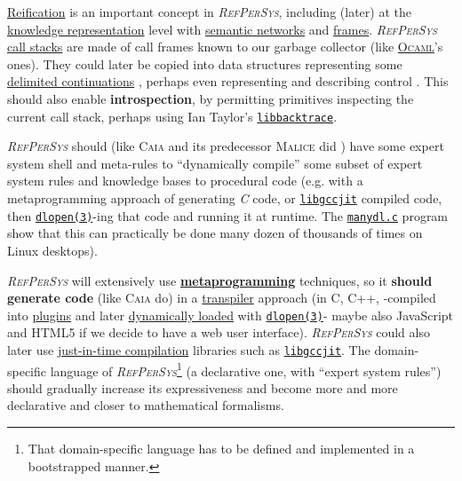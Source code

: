 \documentclass[11pt,a4paper,svgnames]{article}
\newcommand{\RefPerSys}{{\textit{\textsc{RefPerSys}}}}
\begin{document}
\href{https://en.wikipedia.org/wiki/Reification_(computer_science)}{Reification}
is an important concept in \RefPerSys, including (later) at the
\href{https://en.wikipedia.org/wiki/Knowledge_representation_and_reasoning}{knowledge
  representation} level with
\href{https://en.wikipedia.org/wiki/Semantic_network}{semantic
  networks} and
\href{https://en.wikipedia.org/wiki/Frame_(artificial_intelligence)}{frames}. {\RefPerSys}
\href{https://en.wikipedia.org/wiki/Call_stack}{call stacks} are made
of call frames known to our garbage collector (like
\href{https://caml.inria.fr/pub/docs/manual-ocaml/intfc.html}{\textsc{Ocaml}}'s
ones). They could later be copied into data structures representing
some
\href{https://en.wikipedia.org/wiki/Delimited_continuation}{delimited
  continuations} \cite{Reynolds:1993:continuations,
  Queinnec:2004:ContinWeb}, perhaps even representing and describing
control \cite{fouet-starynkevitch:describing-control:1987,
  Starynkevitch-1990-EUM, Pitrat:2009:ArtifBeings}. This should also
enable \textbf{introspection}, by permitting primitives inspecting the
current call stack, perhaps using Ian Taylor's
\href{https://github.com/ianlancetaylor/libbacktrace}{\texttt{libbacktrace}}.


{\RefPerSys} should (like \textsc{Caia} and its predecessor
\textsc{Malice} did
\cite{Pitrat:2009:AST,Pitrat:1996:FGCS,Pitrat:2009:ArtifBeings}) have
some expert system shell \cite{kumar:2015:importance-expert-systems,
  nigro:2008:meta} and meta-rules to ``dynamically compile'' some
subset of expert system rules and knowledge bases to procedural code
(e.g. with a metaprogramming approach of generating \emph{C} code, or
\href{https://gcc.gnu.org/onlinedocs/jit/}{\texttt{libgccjit}}
compiled code, then
\href{http://man7.org/linux/man-pages/man3/dlopen.3.html}{\texttt{dlopen(3)}}-ing
that code and running it at runtime. The
\href{https://github.com/bstarynk/misc-basile/blob/master/manydl.c}{\texttt{manydl.c}}
program show that this can practically be done many dozen of thousands
of times on Linux desktops).

{\RefPerSys} will extensively use
\href{https://en.wikipedia.org/wiki/Metaprogramming}{\textbf{metaprogramming}}
techniques, so it \textbf{should generate code} (like \textsc{Caia}
do) in a
\href{https://en.wikipedia.org/wiki/Source-to-source_compiler}{transpiler}
approach (in C, C++, -compiled into
\href{https://en.wikipedia.org/wiki/Plug-in\_(computing)}{plugins} and
later
\href{https://en.wikipedia.org/wiki/Dynamic\_loading}{dynamically
  loaded} with \href{}{\texttt{dlopen(3)}}- maybe also JavaScript and
HTML5 if we decide to have a web user interface). {\RefPerSys} could
also later use
\href{https://en.wikipedia.org/wiki/Just-in-time_compilation}{just-in-time
  compilation} libraries such as
\href{https://gcc.gnu.org/onlinedocs/jit/}{\texttt{libgccjit}}. The
domain-specific language of \RefPerSys\footnote{That domain-specific
language has to be defined and implemented in a bootstrapped manner.}
(a declarative one, with ``expert system rules'') should gradually
increase its expressiveness and become more and more declarative and
closer to mathematical formalisms.
\end{document}
